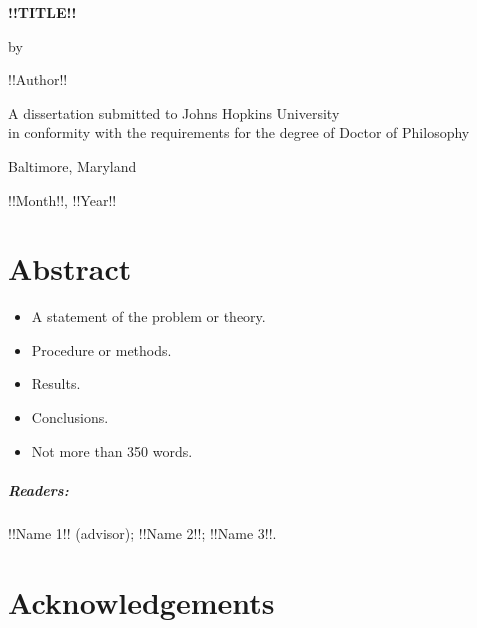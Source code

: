 \documentclass[12pt, oneside]{book}
\begin{document}
\frontmatter

\begin{center}
  \begin{singlespace}
    \vspace*{0.5in}

    \textbf{\uppercase{!!Title!!}}

    \vspace*{1in}

    by
    
    !!Author!!

    \vspace*{1.5in}

    A dissertation submitted to Johns Hopkins University\\in conformity with the requirements for the degree of Doctor of Philosophy

    \vspace*{0.5in}

    Baltimore, Maryland
    
    !!Month!!, !!Year!!
  \end{singlespace}
\end{center}

\thispagestyle{empty}
\clearpage

\chapter{Abstract}

\begin{itemize}
  \item A statement of the problem or theory.
  \item Procedure or methods.
  \item Results.
  \item Conclusions.
  \item Not more than 350 words.
\end{itemize}

\paragraph{Readers:}

!!Name 1!! (advisor); !!Name 2!!; !!Name 3!!.

\chapter{Acknowledgements}

\lipsum[1] %
\end{document}
